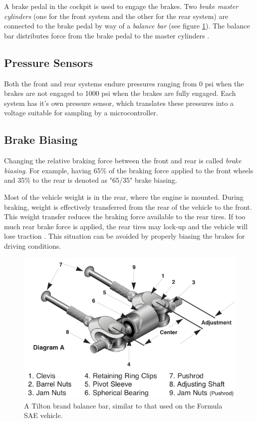 A brake pedal in the cockpit is used to engage the brakes. Two \emph{brake master cylinders} (one for the front system and the other for the rear system) are connected to the brake pedal by way of a \emph{balance bar} (see figure \ref{fig:balance_bar_diag}). The balance bar distributes force from the brake pedal to the master cylinders \cite{TiltonBrakeBias}. 

\subsection{Pressure Sensors}

Both the front and rear systems endure pressures ranging from 0 psi when the brakes are not engaged to 1000 psi when the brakes are fully engaged. Each system has it's own pressure sensor, which translates these pressures into a voltage suitable for sampling by a microcontroller.

\subsection{Brake Biasing}

Changing the relative braking force between the front and rear is called \emph{brake biasing}. For example, having 65\% of the braking force applied to the front wheels and 35\% to the rear is denoted as "65/35" brake biasing. 

Most of the vehicle weight is in the rear, where the engine is mounted. During braking, weight is effectively transferred from the rear of the vehicle to the front. This weight transfer reduces the braking force available to the rear tires. If too much rear brake force is applied, the rear tires may lock-up and the vehicle will lose traction \cite{FundVehicleDynamics}. This situation can be avoided by properly biasing the brakes for driving conditions.

\begin{figure}[h!]
	\centering
	 	\includegraphics[scale=1.0]{Figures/balance_bar_diag.png}
    \caption{A Tilton brand balance bar, similar to that used on the Formula SAE vehicle.}
    \label{fig:balance_bar_diag}
\end{figure}

